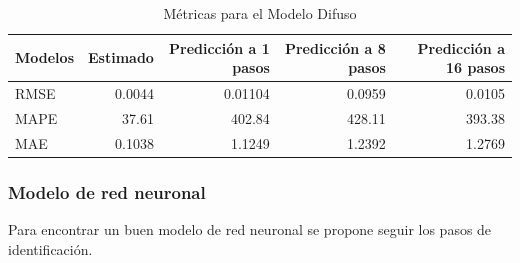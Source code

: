 \documentclass[12pt]{article}
\begin{document}
\begin{table}[htbp]
  \centering
  \caption{Métricas para el Modelo Difuso}
    \begin{tabular}{|l|r|r|r|r|}
    \toprule
    Modelos & \multicolumn{1}{l|}{Estimado} & \multicolumn{1}{p{6em}|}{Predicción a 1 pasos} & \multicolumn{1}{p{6.39em}|}{Predicción a 8 pasos} & \multicolumn{1}{p{5.445em}|}{Predicción a 16 pasos} \\
    \midrule
    RMSE  & 0.0044 & 0.01104 & 0.0959 & 0.0105 \\
    \midrule
    MAPE  & 37.61 & 402.84 & 428.11 & 393.38 \\
    \midrule
    MAE   & 0.1038 & 1.1249 & 1.2392 & 1.2769 \\
    \bottomrule
    \end{tabular}%
  \label{tab:addlabel}%
\end{table}%

\newpage
\subsubsection{Modelo de red neuronal}

Para encontrar un buen modelo de red neuronal se propone seguir los pasos de identificación. 
\end{document}
